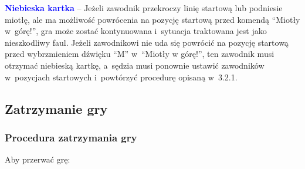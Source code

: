 \documentclass[12pt]{article}
\newcommand\bluecard[1]{\bgroup\textcolor{blue}{\textbf{#1}}}
\begin{document}
\bluecard{Niebieska kartka} -- Jeżeli zawodnik przekroczy linię startową lub
podniesie miotłę, ale ma możliwość powrócenia na pozycję startową przed
komendą ``Miotły w~górę!'', gra może zostać kontynuowana i~sytuacja
traktowana jest jako nieszkodliwy faul. Jeżeli zawodnikowi nie uda się
powrócić na pozycję startową przed wybrzmieniem dźwięku ``M'' w~``Miotły
w górę!'', ten zawodnik musi otrzymać niebieską kartkę, a~sędzia musi
ponownie ustawić zawodników w~pozycjach startowych i~powtórzyć procedurę
opisaną w~3.2.1.

\subsection{Zatrzymanie gry}

\subsubsection{Procedura zatrzymania gry}
Aby przerwać grę:
\end{document}
